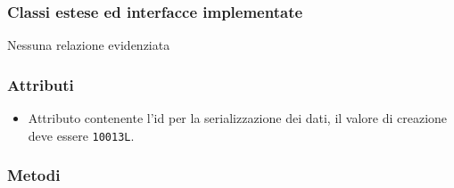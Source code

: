 \subsubsection*{Classi estese ed interfacce implementate}

Nessuna relazione evidenziata

\subsubsection*{Attributi}

\begin{itemize}
	\item{}
	Attributo contenente l'id per la serializzazione dei dati, il valore di creazione deve essere \texttt{10013L}.
\end{itemize}

\subsubsection*{Metodi}

